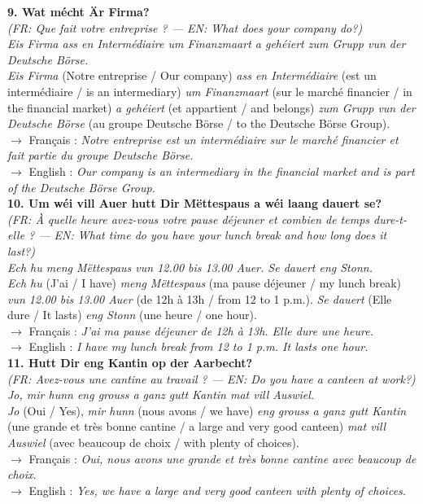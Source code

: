 \noindent\textbf{9. Wat mécht Är Firma?}\\
\textit{(FR: Que fait votre entreprise ? — EN: What does your company do?)}\\[0.3em]
\textit{Eis Firma ass en Intermédiaire um Finanzmaart a gehéiert zum Grupp vun der Deutsche Börse.}\\
\textit{Eis Firma} (Notre entreprise / Our company) \textit{ass en Intermédiaire} (est un intermédiaire / is an intermediary) \textit{um Finanzmaart} (sur le marché financier / in the financial market) \textit{a gehéiert} (et appartient / and belongs) \textit{zum Grupp vun der Deutsche Börse} (au groupe Deutsche Börse / to the Deutsche Börse Group).\\
$\rightarrow$ Français : \textit{Notre entreprise est un intermédiaire sur le marché financier et fait partie du groupe Deutsche Börse.}\\
$\rightarrow$ English : \textit{Our company is an intermediary in the financial market and is part of the Deutsche Börse Group.}\\[0.8em]

\noindent\textbf{10. Um wéi vill Auer hutt Dir Mëttespaus a wéi laang dauert se?}\\
\textit{(FR: À quelle heure avez-vous votre pause déjeuner et combien de temps dure-t-elle ? — EN: What time do you have your lunch break and how long does it last?)}\\[0.3em]
\textit{Ech hu meng Mëttespaus vun 12.00 bis 13.00 Auer. Se dauert eng Stonn.}\\
\textit{Ech hu} (J'ai / I have) \textit{meng Mëttespaus} (ma pause déjeuner / my lunch break) \textit{vun 12.00 bis 13.00 Auer} (de 12h à 13h / from 12 to 1 p.m.). \textit{Se dauert} (Elle dure / It lasts) \textit{eng Stonn} (une heure / one hour).\\
$\rightarrow$ Français : \textit{J'ai ma pause déjeuner de 12h à 13h. Elle dure une heure.}\\
$\rightarrow$ English : \textit{I have my lunch break from 12 to 1 p.m. It lasts one hour.}\\[0.8em]

\noindent\textbf{11. Hutt Dir eng Kantin op der Aarbecht?}\\
\textit{(FR: Avez-vous une cantine au travail ? — EN: Do you have a canteen at work?)}\\[0.3em]
\textit{Jo, mir hunn eng grouss a ganz gutt Kantin mat vill Auswiel.}\\
\textit{Jo} (Oui / Yes), \textit{mir hunn} (nous avons / we have) \textit{eng grouss a ganz gutt Kantin} (une grande et très bonne cantine / a large and very good canteen) \textit{mat vill Auswiel} (avec beaucoup de choix / with plenty of choices).\\
$\rightarrow$ Français : \textit{Oui, nous avons une grande et très bonne cantine avec beaucoup de choix.}\\
$\rightarrow$ English : \textit{Yes, we have a large and very good canteen with plenty of choices.}\\[0.8em]

